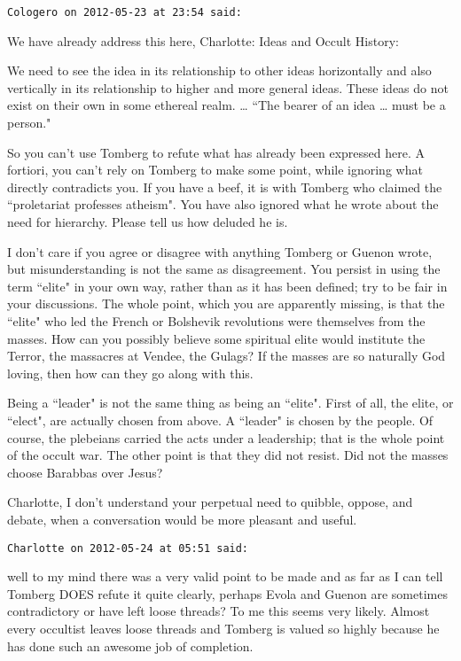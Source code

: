 \begin{footnotesize}
\begin{sffamily}
\hfill

\texttt{Cologero on 2012-05-23 at 23:54 said: }

We have already address this here, Charlotte: Ideas and Occult History:

\begin{quotex}
We need to see the idea in its relationship to other ideas horizontally and also vertically in its relationship to higher and more general ideas. These ideas do not exist on their own in some ethereal realm. … ``The bearer of an idea … must be a person." 

\end{quotex}
So you can't use Tomberg to refute what has already been expressed here. A fortiori, you can't rely on Tomberg to make some point, while ignoring what directly contradicts you. If you have a beef, it is with Tomberg who claimed the ``proletariat professes atheism". You have also ignored what he wrote about the need for hierarchy. Please tell us how deluded he is.

I don't care if you agree or disagree with anything Tomberg or Guenon wrote, but misunderstanding is not the same as disagreement. You persist in using the term ``elite" in your own way, rather than as it has been defined; try to be fair in your discussions. The whole point, which you are apparently missing, is that the ``elite" who led the French or Bolshevik revolutions were themselves from the masses. How can you possibly believe some spiritual elite would institute the Terror, the massacres at Vendee, the Gulags? If the masses are so naturally God loving, then how can they go along with this.

Being a ``leader" is not the same thing as being an ``elite". First of all, the elite, or ``elect", are actually chosen from above. A ``leader" is chosen by the people. Of course, the plebeians carried the acts under a leadership; that is the whole point of the occult war. The other point is that they did not resist. Did not the masses choose Barabbas over Jesus?

Charlotte, I don't understand your perpetual need to quibble, oppose, and debate, when a conversation would be more pleasant and useful.


\hfill

\texttt{Charlotte on 2012-05-24 at 05:51 said: }

well to my mind there was a very valid point to be made and as far as I can tell Tomberg DOES refute it quite clearly, perhaps Evola and Guenon are sometimes contradictory or have left loose threads? To me this seems very likely. Almost every occultist leaves loose threads and Tomberg is valued so highly because he has done such an awesome job of completion. 


\end{sffamily}
\end{footnotesize}
